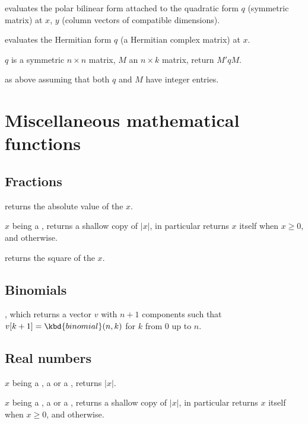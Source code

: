  evaluates the polar bilinear form
attached to the quadratic form $q$ (symmetric matrix) at $x$, $y$ (column
vectors of compatible dimensions).

 evaluates the Hermitian form $q$
(a Hermitian complex matrix) at $x$.

 $q$ is a symmetric $n\times n$ matrix,
$M$ an $n\times k$ matrix, return $M' q M$.

 as above assuming that both
$q$ and $M$ have integer entries.

\newpage
\chapter{Miscellaneous mathematical functions}

\section{Fractions}

 returns the absolute value of the  $x$.

 $x$ being a , returns a shallow
copy of $|x|$, in particular returns $x$ itself when $x \geq 0$, and
 otherwise.

 returns the square of the  $x$.

\section{Binomials}



, which returns a vector $v$ with $n+1$
 components such that $v[k+1] = \kbd{binomial}(n,k)$ for $k$ from
$0$ up to $n$.

\section{Real numbers}

 $x$ being a , a  or a
, returns $|x|$.

 $x$ being a , a  or a
, returns a shallow copy of $|x|$, in particular returns $x$ itself
when $x \geq 0$, and  otherwise.

